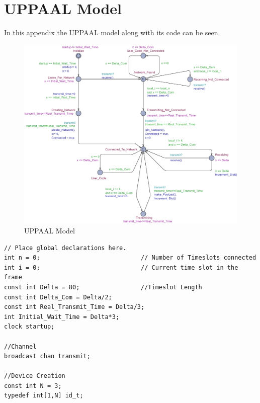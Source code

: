\chapter{UPPAAL Model}\label{app:UPPAAL}
In this appendix the UPPAAL model along with its code can be seen.

\begin{figure}
	\hspace{-100pt}
  \includegraphics[width=1.40\textwidth]{Figures/Model/Device.pdf} 
\caption{UPPAAL Model}
\end{figure}

\begin{lstlisting}[language={[GUI]Uppaal}, % use GUI flavor
columns={[l]flexible},
frameround=fftt, frame=shadowbox, rulesepcolor=\color{gray},
caption={Code for the global declarations.}]
// Place global declarations here.
int n = 0;                   		  // Number of Timeslots connected
int i = 0;                   		  // Current time slot in the frame
const int Delta = 80;                 //Timeslot Length
const int Delta_Com = Delta/2;
const int Real_Transmit_Time = Delta/3;
int Initial_Wait_Time = Delta*3;
clock startup;

//Channel
broadcast chan transmit;

//Device Creation
const int N = 3;
typedef int[1,N] id_t;
\end{lstlisting}



